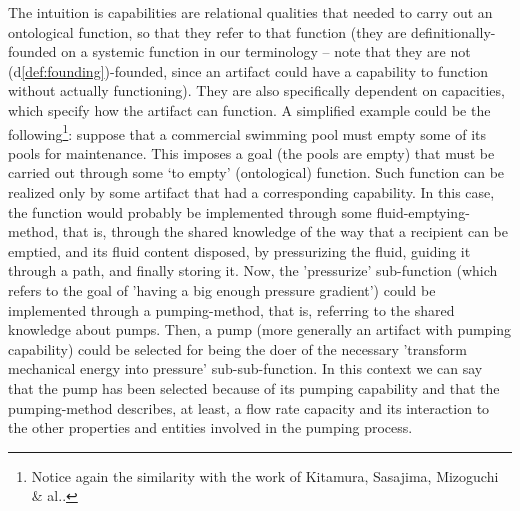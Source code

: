 \documentclass[sw]{iosart2x}
\newcommand{\DefLabel}{\textrm{d}}
\newcommand{\refdf}[1]{({\DefLabel}\ref{#1})}
\begin{document}
The intuition is capabilities are relational qualities that needed to carry out an ontological function, so that they refer to that function (they are definitionally-founded on a systemic function in our terminology -- note that they are not \refdf{def:founding}-founded, since an artifact could have a capability to function without actually functioning). They are also specifically dependent on capacities, which specify how the artifact can function.  
A simplified example could be the following\footnote{Notice again the similarity with the work of Kitamura, Sasajima, Mizoguchi \& al.\cite{kitamuraOntologybasedDescriptionFunctional2003}.}: suppose that a commercial swimming pool must empty some of its pools for maintenance. This imposes a goal (the pools are empty) that must be carried out through some `to empty' (ontological) function. Such function can be realized only by some artifact that had a corresponding capability. In this case, the function would probably be implemented through some fluid-emptying-method, that is, through the shared knowledge of the way that a recipient can be emptied, and its fluid content disposed, by pressurizing the fluid, guiding it through a path, and finally storing it.
Now, the 'pressurize' sub-function (which refers to the goal of 'having a big enough pressure gradient') could be implemented through a pumping-method, that is, referring to the shared knowledge about pumps.
Then, a pump (more generally an artifact with pumping capability) could be selected for being the doer of the necessary 'transform mechanical energy into pressure' sub-sub-function.
In this context we can say that the pump has been selected because of its pumping capability and that the pumping-method describes, at least, a flow rate capacity and its interaction to the other properties and entities involved in the pumping process. 




\end{document}
